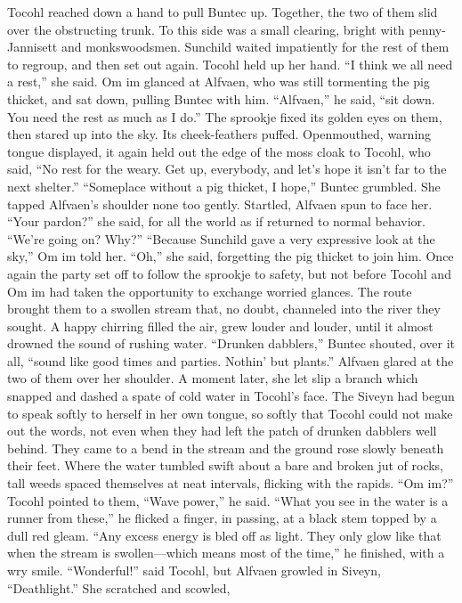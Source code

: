 \documentclass[9pt]{article}
\begin{document}
Tocohl reached down a hand to pull Buntec up. Together, the two of them slid over the obstructing
trunk.
To this side was a small clearing, bright with penny-Jannisett and monkswoodsmen. Sunchild waited
impatiently for the rest of them to regroup, and then set out again.
Tocohl held up her hand. “I think we all need a rest,” she said. Om im glanced at Alfvaen, who was
still tormenting the pig thicket, and sat down, pulling Buntec with him. “Alfvaen,” he said, “sit down. You
need the rest as much as I do.”
The sprookje fixed its golden eyes on them, then stared up into the sky. Its cheek-feathers puffed.
Openmouthed, warning tongue displayed, it again held out the edge of the moss cloak to Tocohl, who
said, “No rest for the weary. Get up, everybody, and let’s hope it isn’t far to the next shelter.”
“Someplace without a pig thicket, I hope,” Buntec grumbled. She tapped Alfvaen’s shoulder none
too gently.
Startled, Alfvaen spun to face her. “Your pardon?” she said, for all the world as if returned to normal
behavior. “We’re going on? Why?”
“Because Sunchild gave a very expressive look at the sky,” Om im told her.
“Oh,” she said, forgetting the pig thicket to join him.
Once again the party set off to follow the sprookje to safety, but not before Tocohl and Om im had
taken the opportunity to exchange worried glances.
The route brought them to a swollen stream that, no doubt, channeled into the river they sought. A
happy chirring filled the air, grew louder and louder, until it almost drowned the sound of rushing water.
“Drunken dabblers,” Buntec shouted, over it all, “sound like good times and parties. Nothin’ but plants.”
Alfvaen glared at the two of them over her shoulder. A moment later, she let slip a branch which
snapped and dashed a spate of cold water in Tocohl’s face. The Siveyn had begun to speak softly to
herself in her own tongue, so softly that Tocohl could not make out the words, not even when they had
left the patch of drunken dabblers well behind.
They came to a bend in the stream and the ground rose slowly beneath their feet. Where the water
tumbled swift about a bare and broken jut of rocks, tall weeds spaced themselves at neat intervals,
flicking with the rapids. “Om im?” Tocohl pointed to them,
“Wave power,” he said. “What you see in the water is a runner from these,” he flicked a finger, in
passing, at a black stem topped by a dull red gleam. “Any excess energy is bled off as light. They only
glow like that when the stream is swollen—which means most of the time,” he finished, with a wry smile.
“Wonderful!” said Tocohl, but Alfvaen growled in Siveyn, “Deathlight.” She scratched and scowled,
\end{document}
